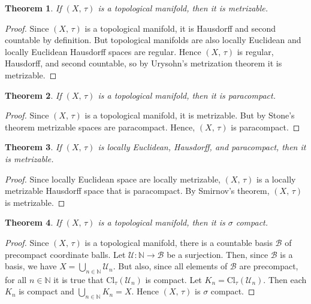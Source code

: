 \documentclass{article}
\theoremstyle{plain}
\newtheorem{theorem}{Theorem}[section]
\theoremstyle{normal}
\begin{document}
        \begin{theorem}
            If $(X,\,\tau)$ is a topological manifold, then it is metrizable.
        \end{theorem}
        \begin{proof}
            Since $(X,\,\tau)$ is a topological manifold, it is Hausdorff and
            second countable by definition. But topological manifolds are
            also locally Euclidean and locally Euclidean Hausdorff spaces are
            regular. Hence $(X,\,\tau)$ is regular, Hausdorff, and second
            countable, so by Urysohn's metrization theorem it is metrizable.
        \end{proof}
        \begin{theorem}
            If $(X,\,\tau)$ is a topological manifold, then it is paracompact.
        \end{theorem}
        \begin{proof}
            Since $(X,\,\tau)$ is a topological manifold, it is metrizable.
            But by Stone's theorem metrizable spaces are paracompact. Hence,
            $(X,\,\tau)$ is paracompact.
        \end{proof}
        \begin{theorem}
            If $(X,\,\tau)$ is locally Euclidean, Hausdorff, and paracompact,
            then it is metrizable.
        \end{theorem}
        \begin{proof}
            Since locally Euclidean space are locally metrizable,
            $(X,\,\tau)$ is a locally metrizable Hausdorff space that is
            paracompact. By Smirnov's theorem, $(X,\,\tau)$ is metrizable.
        \end{proof}
        \begin{theorem}
            If $(X,\,\tau)$ is a topological manifold, then it is
            $\sigma$ compact.
        \end{theorem}
        \begin{proof}
            Since $(X,\,\tau)$ is a topological manifold, there is a countable
            basis $\mathcal{B}$ of precompact coordinate balls. Let
            $\mathcal{U}:\mathbb{N}\rightarrow\mathcal{B}$ be a surjection.
            Then, since $\mathcal{B}$ is a basis, we have
            $X=\bigcup_{n\in\mathbb{N}}\mathcal{U}_{n}$. But also, since all
            elements of $\mathcal{B}$ are precompact, for all $n\in\mathbb{N}$
            it is true that $\textrm{Cl}_{\tau}(\mathcal{U}_{n})$ is
            compact. Let $K_{n}=\textrm{Cl}_{\tau}(\mathcal{U}_{n})$. Then
            each $K_{n}$ is compact and $\bigcup_{n\in\mathbb{N}}K_{n}=X$.
            Hence $(X,\,\tau)$ is $\sigma$ compact.
        \end{proof}
\end{document}
